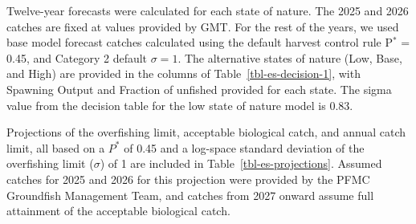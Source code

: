 \documentclass[
]{article}
\begin{document}
Twelve-year forecasts were calculated for each state of nature. The 2025
and 2026 catches are fixed at values provided by GMT. For the rest of
the years, we used base model forecast catches calculated using the
default harvest control rule P\(^*\) = 0.45, and Category 2 default
\(\sigma = 1\). The alternative states of nature (Low, Base, and High)
are provided in the columns of Table~\ref{tbl-es-decision-1}, with
Spawning Output and Fraction of unfished provided for each state. The
sigma value from the decision table for the low state of nature model is
0.83.

Projections of the overfishing limit, acceptable biological catch, and
annual catch limit, all based on a \(P^*\) of 0.45 and a log-space
standard deviation of the overfishing limit (\(\sigma\)) of 1 are
included in Table~\ref{tbl-es-projections}. Assumed catches for 2025 and
2026 for this projection were provided by the PFMC Groundfish Management
Team, and catches from 2027 onward assume full attainment of the
acceptable biological catch.
\end{document}
